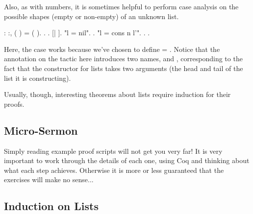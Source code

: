 \documentclass[12pt]{report}
\begin{document}
 Also, as with numbers, it is sometimes helpful to perform case
    analysis on the possible shapes (empty or non-empty) of an unknown
    list. \begin{coqdoccode}
\coqdocemptyline
\coqdocnoindent
{}  : \coqdockw{\ensuremath{\forall}} :,\coqdoceol
\coqdocindent{1.00em}
 ( ) =  ( ).\coqdoceol
\coqdocnoindent
{}.\coqdoceol
\coqdocindent{1.00em}
 .    [|  ].\coqdoceol
\coqdocindent{1.00em}
 "l = nil".\coqdoceol
\coqdocindent{2.00em}
.\coqdoceol
\coqdocindent{1.00em}
 "l = cons n l'".\coqdoceol
\coqdocindent{2.00em}
. .\coqdoceol
\coqdocemptyline
\end{coqdoccode}
Here, the  case works because we've chosen to define
      = . Notice that the  annotation on the 
    tactic here introduces two names,  and , corresponding to
    the fact that the  constructor for lists takes two
    arguments (the head and tail of the list it is constructing). 

 Usually, though, interesting theorems about lists require
    induction for their proofs. \begin{coqdoccode}
\coqdocemptyline
\end{coqdoccode}
\subsection{Micro-Sermon}



 Simply reading example proof scripts will not get you very far!
    It is very important to work through the details of each one,
    using Coq and thinking about what each step achieves.  Otherwise
    it is more or less guaranteed that the exercises will make no
    sense... \begin{coqdoccode}
\coqdocemptyline
\end{coqdoccode}
\subsection{Induction on Lists}
\end{document}
